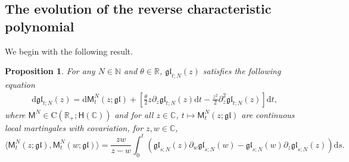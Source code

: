 \documentclass[]{article}
\newtheorem{prop}[thm]{Proposition}
\begin{document}
\subsection{The evolution of the reverse characteristic polynomial}


We begin with the following result.

\begin{prop}\label{PropGLfiniteCharPolyEq}
    For any $N\in\mathbb{N}$ and $\theta\in\mathbb{R}$,
    $\mathfrak{gl}_{t;N}(z)$ satisfies the following equation
\begin{align}\label{phi^N-equ}
    \mathrm{d}\mathfrak{gl}_{t;N}(z)
    =
\mathrm{d}\mathsf{M}^N_t(z;\mathfrak{gl})
       +\left[\frac{\theta}{2}z\partial_z\mathfrak{gl}_{t;N}(z)\mathrm{d}t
    -
    \frac{z^2}{2}\partial_{z}^2\mathfrak{gl}_{t;N}(z)\right]\mathrm{d}t,
\end{align}
where $\mathsf{M}^N\in \mathrm{C}(\mathbb{R}_+;\mathsf{H}(\mathbb{C}))$ and for all $z\in \mathbb{C}$, $t\mapsto \mathsf{M}_t^N(z;\mathfrak{gl})$ are continuous local martingales with covariation, for $z,w \in \mathbb{C}$,
\begin{equation}\label{CovarGLfiniteN}
\langle \mathsf{M}_t^N(z;\mathfrak{gl}),\mathsf{M}_t^N(w;\mathfrak{gl})\rangle=\frac{zw}{z-w}\int_0^t\left(\mathfrak{gl}_{s;N}(z)\partial_w\mathfrak{gl}_{s;N}(w)-\mathfrak{gl}_{s;N}(w)\partial_z\mathfrak{gl}_{s;N}(z)\right)\mathrm{d}s.
\end{equation}

\end{prop}
\end{document}
